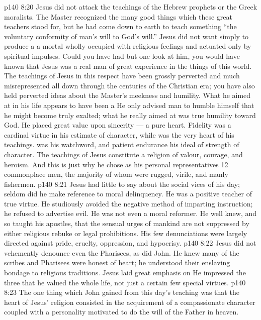 \vs p140 8:20 Jesus did not attack the teachings of the Hebrew prophets or the Greek moralists. The Master recognized the many good things which these great teachers stood for, but he had come down to earth to teach something  “the voluntary conformity of man’s will to God’s will.” Jesus did not want simply to produce a  a mortal wholly occupied with religious feelings and actuated only by spiritual impulses. Could you have had but one look at him, you would have known that Jesus was a real man of great experience in the things of this world. The teachings of Jesus in this respect have been grossly perverted and much misrepresented all down through the centuries of the Christian era; you have also held perverted ideas about the Master’s meekness and humility. What he aimed at in his life appears to have been a  He only advised man to humble himself that he might become truly exalted; what he really aimed at was true humility toward God. He placed great value upon sincerity --- a pure heart. Fidelity was a cardinal virtue in his estimate of character, while  was the very heart of his teachings.  was his watchword, and patient endurance his ideal of strength of character. The teachings of Jesus constitute a religion of valour, courage, and heroism. And this is just why he chose as his personal representatives 12 commonplace men, the majority of whom were rugged, virile, and manly fishermen.
\vs p140 8:21 Jesus had little to say about the social vices of his day; seldom did he make reference to moral delinquency. He was a positive teacher of true virtue. He studiously avoided the negative method of imparting instruction; he refused to advertise evil. He was not even a moral reformer. He well knew, and so taught his apostles, that the sensual urges of mankind are not suppressed by either religious rebuke or legal prohibitions. His few denunciations were largely directed against pride, cruelty, oppression, and hypocrisy.
\vs p140 8:22 Jesus did not vehemently denounce even the Pharisees, as did John. He knew many of the scribes and Pharisees were honest of heart; he understood their enslaving bondage to religious traditions. Jesus laid great emphasis on  He impressed the three that he valued the whole life, not just a certain few special virtues.
\vs p140 8:23 \pc The one thing which John gained from this day’s teaching was that the heart of Jesus’ religion consisted in the acquirement of a compassionate character coupled with a personality motivated to do the will of the Father in heaven.
